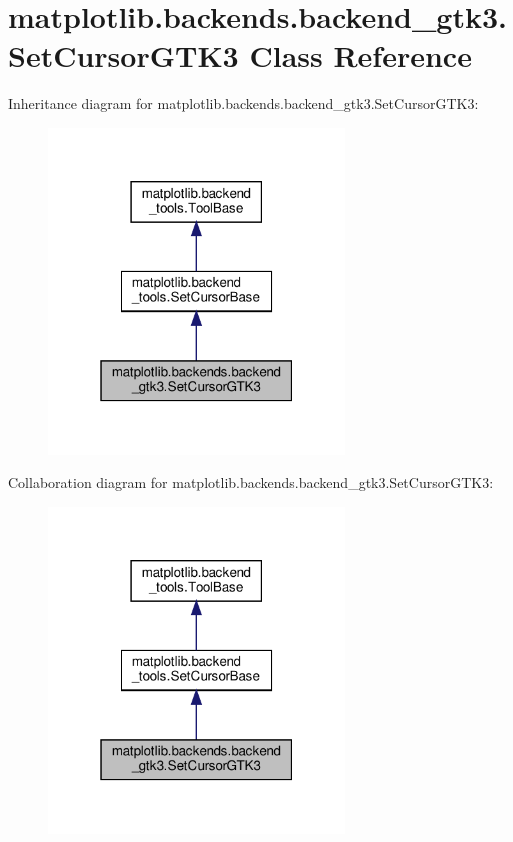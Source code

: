 \hypertarget{classmatplotlib_1_1backends_1_1backend__gtk3_1_1SetCursorGTK3}{}\section{matplotlib.\+backends.\+backend\+\_\+gtk3.\+Set\+Cursor\+G\+T\+K3 Class Reference}
\label{classmatplotlib_1_1backends_1_1backend__gtk3_1_1SetCursorGTK3}


Inheritance diagram for matplotlib.\+backends.\+backend\+\_\+gtk3.\+Set\+Cursor\+G\+T\+K3\+:
\nopagebreak
\begin{figure}[H]
\begin{center}
\leavevmode
\includegraphics[width=223pt]{classmatplotlib_1_1backends_1_1backend__gtk3_1_1SetCursorGTK3__inherit__graph}
\end{center}
\end{figure}


Collaboration diagram for matplotlib.\+backends.\+backend\+\_\+gtk3.\+Set\+Cursor\+G\+T\+K3\+:
\nopagebreak
\begin{figure}[H]
\begin{center}
\leavevmode
\includegraphics[width=223pt]{classmatplotlib_1_1backends_1_1backend__gtk3_1_1SetCursorGTK3__coll__graph}
\end{center}
\end{figure}
